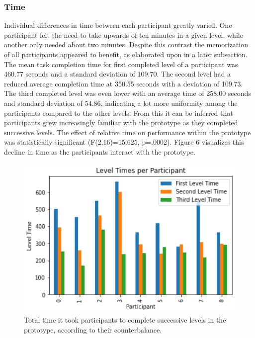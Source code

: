 \documentclass{vgtc}                          %
\begin{document}
\subsubsection{Time}

Individual differences in time between each participant greatly varied. One participant felt the need to take upwards of ten minutes in a given level, while another only needed about two minutes. Despite this contrast the memorization of all participants appeared to benefit, as elaborated upon in a later subsection. The mean task completion time for first completed level of a participant was 460.77 seconds and a standard deviation of 109.70. The second level had a reduced average completion time at 350.55 seconds with a deviation of 109.73. The third completed level was even lower with an average time of 258.00 seconds and standard deviation of 54.86, indicating a lot more uniformity among the participants compared to the other levels. From this it can be inferred that participants grew increasingly familiar with the prototype as they completed successive levels. The effect of relative time on performance within the prototype was statistically significant (F(2,16)=15.625, p=.0002). Figure 6 visualizes this decline in time as the participants interact with the prototype.

\begin{figure}[tb]
 \centering 
 \includegraphics[width=\linewidth]{LevelTimesParticipants.png}
 \caption{Total time it took participants to complete successive levels in the prototype, according to their counterbalance.}
 \label{fig:sample}
\end{figure}
\end{document}
